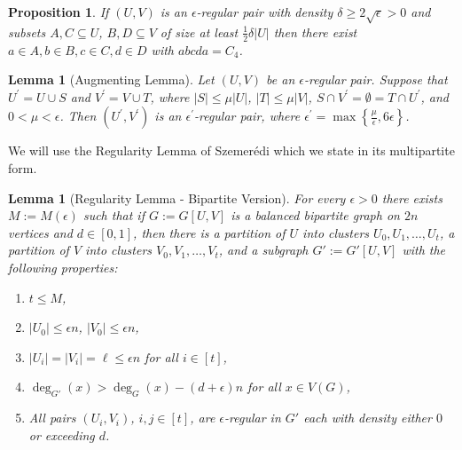 \documentclass[oneside,12pt]{memoir}
\newtheorem{lemma}[theorem]{Lemma}
\newtheorem{proposition}[theorem]{Proposition}
\newcommand{\ep}{\epsilon}
\begin{document}
% 

\begin{proposition}
\label{C4} If $(U,V)$ is an 
$\ep$-regular pair with density $\delta\ge 2\sqrt\ep>0$ and subsets $A,C\subseteq U$, $B,D\subseteq V$ of size at least $\frac{1}{2}\delta|U|$ then there exist $a\in A,b\in B,c\in C,d\in D$ with  $abcda=C_4$.
\end{proposition}


\begin{lemma}[Augmenting Lemma]
\label{aug}Let $\left( U,V\right) $ be an $\ep $-regular pair.
Suppose that $U^{\prime }=U\cup S$ and $V^{\prime }=V\cup T$, where $\left|
S\right| \leq \mu \left| U\right| $, $\left| T\right| \leq \mu \left|
V\right| $, $S\cap V^{\prime }=\emptyset =T\cap U^{\prime }$, and $0<\mu
<\ep $. Then $\left( U^{\prime },V^{\prime }\right) $ is an $%
\ep ^{\prime }$-regular pair, where $\ep ^{\prime }=\max
\left\{ \frac{\mu }{\ep },6\ep \right\} $.
\end{lemma}


We will use the Regularity Lemma of Szemer\'{e}di \cite{Sz} which we state in its multipartite form.

\begin{lemma}[Regularity Lemma - Bipartite Version]\label{bireg} 
For every $\ep>0$ there exists $M:=M(\ep)$ such that if $G:=G[U,V]$ is a balanced bipartite graph on $2n$ vertices and $d\in[0,1]$, then there is a partition of $U$ into clusters $U_0, U_1,\dots, U_t$, a partition of $V$ into clusters $V_0, V_1,\dots, V_t$, and a subgraph $G':=G'[U,V]$ with the following properties: 

\begin{enumerate}
\item $t\leq M$,
\item $|U_0|\leq \ep n$, $|V_0|\leq \ep n$,
\item $|U_i|=|V_i|=\ell\leq \ep n$ for all $i\in [t]$,
\item $\deg_{G'}(x)>\deg_G(x)-(d+\ep)n$ for all $x\in V(G)$,
\item All pairs $(U_i, V_i)$, $i,j\in [t]$, are $\ep$-regular in $G'$ each with density either $0$ or exceeding $d$.

\end{enumerate}
\end{lemma}
\end{document}
